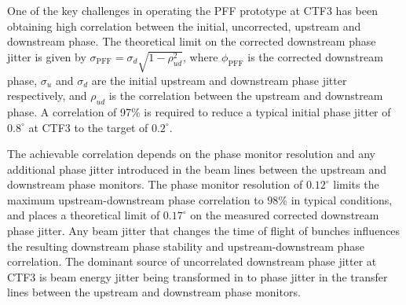 \documentclass[%
 reprint,
superscriptaddress,
 amsmath,amssymb,
 prl,
]{revtex4-1}
\begin{document}

One of the key challenges in operating the PFF prototype at CTF3 has been 
obtaining high correlation between the initial, uncorrected, upstream and 
downstream phase. The theoretical limit on the corrected 
downstream phase jitter is given by
\(\sigma_{\mathrm{PFF}}=\sigma_d \sqrt{1-\rho_{ud}^2}\), where 
\(\phi_{\mathrm{PFF}}\) is the corrected downstream phase, \(\sigma_u\) and 
\(\sigma_d\) are the initial upstream and downstream 
phase jitter respectively, and \(\rho_{ud}\) is the correlation between the 
upstream and downstream phase. A correlation of 97\% is required to reduce a 
typical initial 
phase jitter of \(0.8^\circ\) at CTF3 to the target of \(0.2^\circ\). 

The achievable correlation depends on the phase monitor resolution and any 
additional phase jitter introduced in the beam lines between the upstream and 
downstream phase monitors. The phase monitor resolution of \(0.12^\circ\) 
limits the maximum upstream-downstream phase correlation to
\(98\%\) in typical conditions, and places a theoretical limit of
\(0.17^\circ\) on the measured corrected downstream phase 
jitter. 
Any beam jitter that changes the time of flight of bunches influences the 
resulting downstream phase stability and upstream-downstream phase correlation. 
The dominant source of uncorrelated downstream phase jitter at CTF3 is beam 
energy jitter being transformed in to phase jitter in the transfer lines 
between the upstream and downstream phase monitors.
\end{document}
